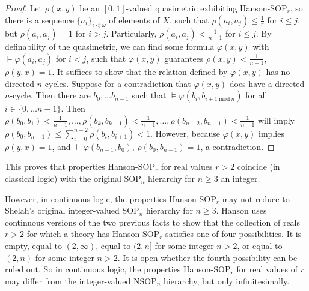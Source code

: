 \documentclass{amsart}
\theoremstyle{definition}
\theoremstyle{remark}
\numberwithin{equation}{section}
\begin{document}
\begin{proof}
    Let $\rho(x, y)$ be an $[0, 1]$-valued quasimetric exhibiting Hanson-$\mathrm{SOP}_{r}$, so there is a sequence $\{a_{i}\}_{i < \omega}$ of elements of $X$, such that $\rho(a_{i}, a_{j})\leq \frac{1}{r}$ for $i \leq j$, but $\rho(a_{i}, a_{j})= 1$ for $i > j$. Particularly, $\rho(a_{i}, a_{j}) < \frac{1}{n-1}$ for $i \leq j$. By definability of the quasimetric, we can find some formula $\varphi(x, y)$ with $\models \varphi(a_{i}, a_{j})$ for $i < j$, such that $\varphi(x, y)$ guarantees $\rho(x, y) < \frac{1}{n-1}$, $\rho (y, x) = 1$. It suffices to show that the relation defined by $\varphi(x, y)$ has no directed $n$-cycles. Suppose for a contradiction that $\varphi(x, y)$ does have a directed $n$-cycle. Then there are $b_{0}, \ldots b_{n-1}$ such that $\models \varphi(b_{i}, b_{i+1 \mathrm{\: mod \:} n})$ for all $i \in \{0, \ldots n-1\}$. Then $\rho(b_{0}, b_{1}) < \frac{1}{n-1}, \ldots , \rho(b_{k}, b_{k +1}) < \frac{1}{n-1}, \ldots, \rho(b_{n-2}, b_{n-1}) < \frac{1}{n-1}$ will imply $\rho(b_{0}, b_{n-1}) \leq \sum^{n-2}_{i =0} \rho(b_{i}, b_{i +1})< 1$. However, because  $\varphi(x, y)$ implies $\rho (y, x) = 1$, and $\models \varphi(b_{n-1}, b_{0})$, $\rho(b_{0}, b_{n-1}) = 1$, a contradiction.
\end{proof}

This proves that properties Hanson-$\mathrm{SOP}_{r}$ for real values $r > 2$ coincide (in classical logic) with the original $\mathrm{SOP}_{n}$ hierarchy for $n \geq 3$ an integer.


However, in continuous logic, the properties Hanson-$\mathrm{SOP}_{r}$ may not reduce  to Shelah's original integer-valued $\mathrm{SOP}_{n}$ hierarchy for $n \geq 3$. Hanson uses continuous versions of the two previous facts to show that the collection of reals $r > 2$ for which a theory has Hanson-$\mathrm{SOP}_{r}$ satisfies one of four possibilities. It is empty, equal to $(2, \infty)$, equal to $(2, n]$ for some integer $n > 2$, or equal to $(2, n)$ for some integer $n > 2$. It is open whether the fourth possibility can be ruled out. So in continuous logic, the properties Hanson-$\mathrm{SOP}_{r}$ for real values of $r$ may differ from the integer-valued $\mathrm{NSOP}_{n}$ hierarchy, but only infinitesimally.
\end{document}
